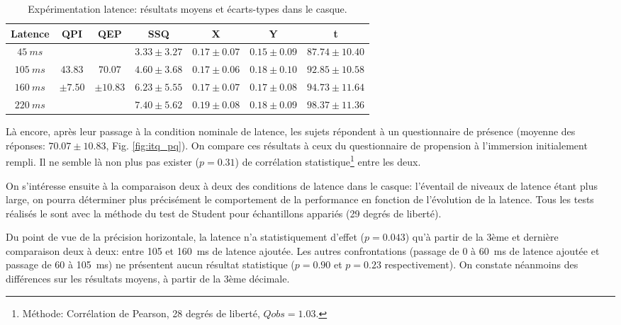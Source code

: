 	\begin{table}[h]	
		\centering
		\caption{Expérimentation latence: résultats moyens et écarts-types dans le casque.}
		\label{tab:resultats_casque_latence}
		\begin{tabular}{c|c|c|c|c|c|c}
			\textbf{Latence} & \textbf{QPI} & \textbf{QEP} & \textbf{SSQ} & \textbf{X} & \textbf{Y} & \textbf{t}\\ \hline			
			$45~ms$ & & & $3.33 \pm 3.27$ & $0.17 \pm 0.07$ & $0.15 \pm 0.09$ & $87.74 \pm 10.40$\\
			$105~ms$ & $43.83$ & $70.07$ & $4.60 \pm 3.68$ & $0.17 \pm 0.06$ & $0.18 \pm 0.10$ & $92.85 \pm 10.58$\\			
			$160~ms$ & $\pm 7.50$ & $\pm 10.83$ & $6.23 \pm 5.55$ & $0.17 \pm 0.07$ & $0.17 \pm 0.08$ & $94.73 \pm 11.64$\\
			$220~ms$ & & & $7.40 \pm 5.62$ & $0.19 \pm 0.08$ & $0.18 \pm 0.09$ & $98.37 \pm 11.36$\\
		\end{tabular}
	\end{table}
	
	\par Là encore, après leur passage à la condition nominale de latence, les sujets répondent à un questionnaire de présence (moyenne des réponses: $70.07 \pm 10.83$, Fig. \ref{fig:itq_pq}). On compare ces résultats à ceux du questionnaire de propension à l'immersion initialement rempli. Il ne semble là non plus pas exister ($p = 0.31$) de corrélation statistique\footnote{Méthode: Corrélation de Pearson, 28 degrés de liberté, $Qobs = 1.03$.} entre les deux.
	
	\par On s'intéresse ensuite à la comparaison deux à deux des conditions de latence dans le casque: l'éventail de niveaux de latence étant plus large, on pourra déterminer plus précisément le comportement de la performance en fonction de l'évolution de la latence. Tous les tests réalisés le sont avec la méthode du test de Student pour échantillons appariés (29 degrés de liberté).
	
	\par Du point de vue de la précision horizontale, la latence n'a statistiquement d'effet ($p = 0.043$) qu'à partir de la 3ème et dernière comparaison deux à deux: entre 105 et 160~ms de latence ajoutée. Les autres confrontations (passage de 0 à 60~ms de latence ajoutée et passage de 60 à 105~ms) ne présentent aucun résultat statistique ($p = 0.90$ et $p = 0.23$ respectivement). On constate néanmoins des différences sur les résultats moyens, à partir de la 3ème décimale.
	
